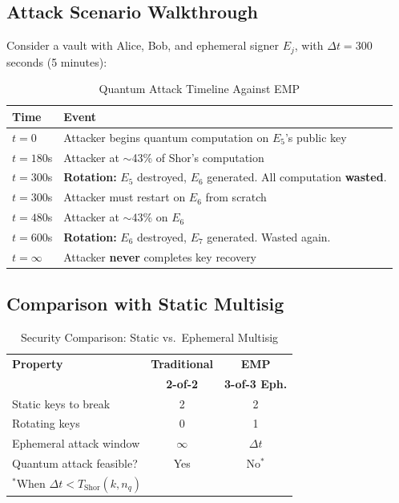 \documentclass[12pt, a4paper, twocolumn]{article}
\begin{document}
\subsection{Attack Scenario Walkthrough}

Consider a vault with Alice, Bob, and ephemeral signer $E_j$, with $\Delta t = 300$ seconds (5 minutes):

\begin{table}[H]
\centering
\caption{Quantum Attack Timeline Against EMP}
\label{tab:attack_timeline}
\begin{tabular}{lp{4.5cm}}
\toprule
\textbf{Time} & \textbf{Event} \\
\midrule
$t = 0$ & Attacker begins quantum computation on $E_5$'s public key \\
$t = 180$s & Attacker at $\sim$43\% of Shor's computation \\
$t = 300$s & \textbf{Rotation:} $E_5$ destroyed, $E_6$ generated. All computation \textbf{wasted}. \\
$t = 300$s & Attacker must restart on $E_6$ from scratch \\
$t = 480$s & Attacker at $\sim$43\% on $E_6$ \\
$t = 600$s & \textbf{Rotation:} $E_6$ destroyed, $E_7$ generated. Wasted again. \\
$t = \infty$ & Attacker \textbf{never} completes key recovery \\
\bottomrule
\end{tabular}
\end{table}

\subsection{Comparison with Static Multisig}

\begin{table}[H]
\centering
\caption{Security Comparison: Static vs.\ Ephemeral Multisig}
\label{tab:security_comparison}
\begin{tabular}{lcc}
\toprule
\textbf{Property} & \textbf{Traditional} & \textbf{EMP} \\
 & \textbf{2-of-2} & \textbf{3-of-3 Eph.} \\
\midrule
Static keys to break & 2 & 2 \\
Rotating keys & 0 & 1 \\
Ephemeral attack window & $\infty$ & $\Delta t$ \\
Quantum attack feasible? & Yes & No$^*$ \\
\bottomrule
\multicolumn{3}{l}{\scriptsize $^*$When $\Delta t < T_{\text{Shor}}(k, n_q)$}
\end{tabular}
\end{table}
\end{document}
